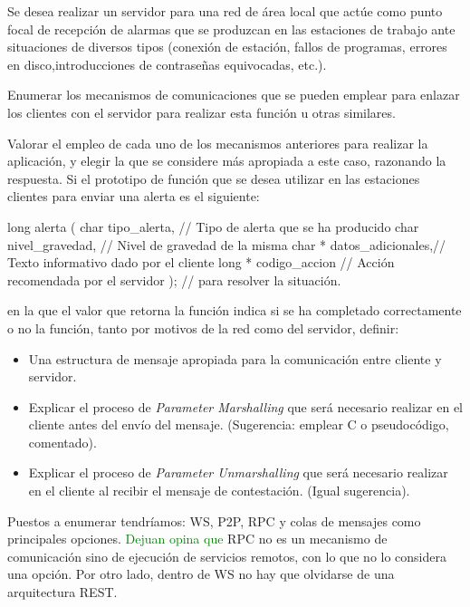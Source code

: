   \begin{problem}[13]
  Se desea realizar un servidor para una red de área local que actúe como
punto focal de recepción de alarmas que se produzcan en las estaciones de
trabajo ante situaciones de diversos tipos (conexión de estación, fallos de
programas, errores en disco,introducciones de contraseñas equivocadas, etc.).

    \ppart Enumerar los mecanismos de comunicaciones que se pueden emplear para
enlazar los clientes con el servidor para realizar esta función u otras
similares.

    \ppart Valorar el empleo de cada uno de los mecanismos anteriores para realizar la
aplicación, y elegir la que se considere más apropiada a este caso, razonando
la respuesta.
    \ppart Si el prototipo de función que se desea utilizar en las estaciones clientes
para enviar una alerta es el siguiente:
\begin{verbnobox}[\small]
long alerta (
char tipo_alerta,      // Tipo de alerta que se ha producido
char nivel_gravedad,   // Nivel de gravedad de la misma
char * datos_adicionales,// Texto informativo dado por el cliente
long * codigo_accion   // Acción recomendada por el servidor
);                     //  para resolver la situación.
\end{verbnobox}
    en la que el valor que retorna la función indica si se ha completado
correctamente o no la función, tanto por motivos de la red como del servidor,
definir:
    \begin{itemize}
      \item Una estructura de mensaje apropiada para la comunicación entre cliente y
servidor.
      \item Explicar el proceso de \textit{Parameter Marshalling} que será necesario
realizar en el cliente antes del envío del mensaje. (Sugerencia: emplear C o
pseudocódigo, comentado).
      \item Explicar el proceso de \textit{Parameter Unmarshalling} que será necesario
realizar en el cliente al recibir el mensaje de contestación. (Igual sugerencia).
    \end{itemize}
      \solution

      \yoP

      \spart

      Puestos a enumerar tendríamos: WS, P2P, RPC y colas de mensajes como principales opciones. \textcolor{green}{Dejuan opina que} RPC no es un mecanismo de comunicación sino de ejecución de servicios remotos, con lo que no lo considera una opción. Por otro lado, dentro de WS no hay que olvidarse de una arquitectura REST.


\end{problem}
